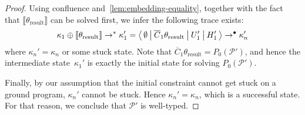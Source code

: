 \begin{proof}
    Using confluence and~\cref{lem:embedding-equality}, together with the fact that ${\llbracket \theta_{\text{result}} \rrbracket}$ can be solved first, we infer the following trace exists:
    \[
        \kappa_1 \oplus {\llbracket \theta_{\text{result}} \rrbracket}
        \rightarrow^{\ast}
        \kappa_1' = \big\langle\, \emptyset\: \big|\: \overline{C}_1\theta_{\text{result}}\: \big|\: U_1'\: \big|\: H_1'\, \big\rangle
        \rightarrow^{\bullet}
        \kappa_n'
    \]
    where $\kappa_n' = \kappa_n$ or some stuck state.
    Note that $\overline{C}_1\theta_{\text{result}} = {P_0(\mathcal{P}')}$,
    and hence the intermediate state~$\kappa_1'$ is exactly the initial state for solving $P_0(\mathcal{P}')$.

    Finally, by our assumption that the initial constraint cannot get stuck on a ground program, $\kappa_n'$ cannot be stuck.
    Hence $\kappa_n' = \kappa_n$, which is a successful state.
    For that reason, we conclude that $\mathcal{P}'$ is well-typed.

\end{proof}
